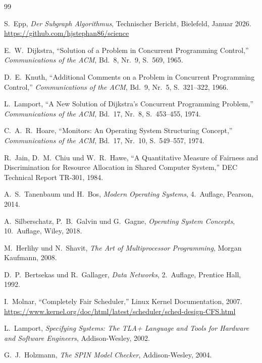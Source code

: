 ﻿\documentclass[a4paper,12pt]{article}
\theoremstyle{definition}
\begin{document}
\begin{thebibliography}{99}

  S.~Epp,
  \textit{Der Subgraph Algorithmus},
  Technischer Bericht, Bielefeld, Januar 2026.
  \url{https://github.com/hjstephan86/science}

  E.~W.~Dijkstra,
  ``Solution of a Problem in Concurrent Programming Control,''
  \textit{Communications of the ACM},
  Bd.~8, Nr.~9, S.~569, 1965.

  D.~E.~Knuth,
  ``Additional Comments on a Problem in Concurrent Programming
  Control,''
  \textit{Communications of the ACM},
  Bd.~9, Nr.~5, S.~321--322, 1966.

  L.~Lamport,
  ``A New Solution of Dijkstra's Concurrent Programming Problem,''
  \textit{Communications of the ACM},
  Bd.~17, Nr.~8, S.~453--455, 1974.

  C.~A.~R.~Hoare,
  ``Monitors: An Operating System Structuring Concept,''
  \textit{Communications of the ACM},
  Bd.~17, Nr.~10, S.~549--557, 1974.

  R.~Jain, D.~M.~Chiu und W.~R.~Hawe,
  ``A Quantitative Measure of Fairness and Discrimination for
  Resource Allocation in Shared Computer System,''
  DEC Technical Report TR-301, 1984.

  A.~S.~Tanenbaum und H.~Bos,
  \textit{Modern Operating Systems}, 4.~Auflage,
  Pearson, 2014.

  A.~Silberschatz, P.~B.~Galvin und G.~Gagne,
  \textit{Operating System Concepts}, 10.~Auflage,
  Wiley, 2018.

  M.~Herlihy und N.~Shavit,
  \textit{The Art of Multiprocessor Programming},
  Morgan Kaufmann, 2008.

  D.~P.~Bertsekas und R.~Gallager,
  \textit{Data Networks}, 2.~Auflage,
  Prentice Hall, 1992.

  I.~Molnar,
  ``Completely Fair Scheduler,''
  Linux Kernel Documentation, 2007.
  \url{https://www.kernel.org/doc/html/latest/scheduler/sched-design-CFS.html}

  L.~Lamport,
  \textit{Specifying Systems: The TLA+ Language and Tools for
  Hardware and Software Engineers},
  Addison-Wesley, 2002.

  G.~J.~Holzmann,
  \textit{The SPIN Model Checker},
  Addison-Wesley, 2004.


\end{thebibliography}
\end{document}
